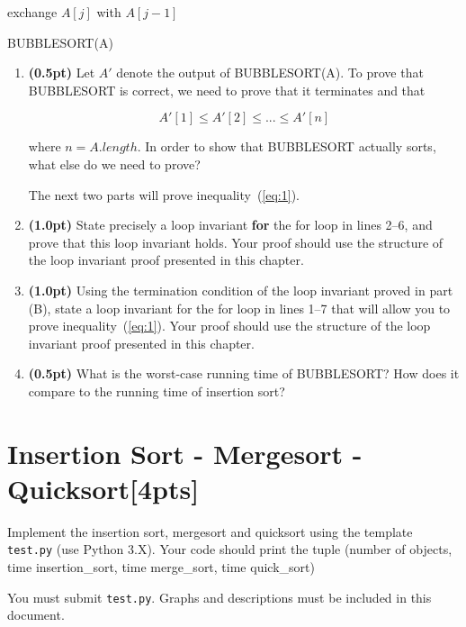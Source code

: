 \documentclass{article}
\begin{document}
\begin{algorithm}[H]
\SetAlgoLined
   {
     {
       {
        exchange $A[j]$ with $A[j-1]$
      }
    }
  }
\caption{BUBBLESORT(A)}
\end{algorithm}

\begin{enumerate}[label=\Alph*]
  \item \textbf{(0.5pt)} Let $A'$ denote the output of BUBBLESORT(A). To prove that BUBBLESORT is correct, we need to prove that it terminates and that

  \begin{equation} \label{eq:1}
    A'[1] \leq A'[2] \leq ... \leq A'[n]
  \end{equation}

  where $n = A.length$. In order to show that BUBBLESORT actually sorts, what else do we need to prove?

  The next two parts will prove inequality~(\ref{eq:1}).

  \item \textbf{(1.0pt)} State precisely a loop invariant \textbf{for} the for loop in lines 2–6, and prove that this loop invariant holds. Your proof should use the structure of the loop invariant proof presented in this chapter.

  \item \textbf{(1.0pt)} Using the termination condition of the loop invariant proved in part (B), state a loop invariant for the for loop in lines 1–7 that will allow you to prove inequality~(\ref{eq:1}). Your proof should use the structure of the loop invariant proof presented in this chapter.

  \item \textbf{(0.5pt)} What is the worst-case running time of BUBBLESORT? How does it compare to the running time of insertion sort?
\end{enumerate}


\section{Insertion Sort - Mergesort - Quicksort[4pts]}
Implement the insertion sort, mergesort and quicksort using the template \texttt{test.py} (use Python 3.X). Your code should print the tuple (number of objects, time insertion\_sort, time merge\_sort, time quick\_sort)

You must submit \texttt{test.py}. Graphs and descriptions must be included in this document. 
\end{document}
